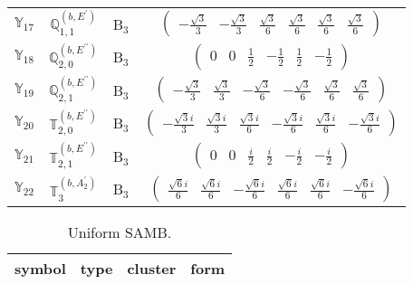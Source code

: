 \documentclass[fleqn,10pt,landscape]{article}
\begin{document}
\begin{itemize}
\begin{center}
\begin{longtable}{c|c|c|c}
$ \mathbb{Y}_{17} $ & $\mathbb{Q}_{1,1}^{(b,E^{\prime})}$ & B$_{3}$ & $\begin{pmatrix} - \frac{\sqrt{3}}{3} & - \frac{\sqrt{3}}{3} & \frac{\sqrt{3}}{6} & \frac{\sqrt{3}}{6} & \frac{\sqrt{3}}{6} & \frac{\sqrt{3}}{6} \end{pmatrix}$ \\
$ \mathbb{Y}_{18} $ & $\mathbb{Q}_{2,0}^{(b,E^{\prime\prime})}$ & B$_{3}$ & $\begin{pmatrix} 0 & 0 & \frac{1}{2} & - \frac{1}{2} & \frac{1}{2} & - \frac{1}{2} \end{pmatrix}$ \\
$ \mathbb{Y}_{19} $ & $\mathbb{Q}_{2,1}^{(b,E^{\prime\prime})}$ & B$_{3}$ & $\begin{pmatrix} - \frac{\sqrt{3}}{3} & \frac{\sqrt{3}}{3} & - \frac{\sqrt{3}}{6} & - \frac{\sqrt{3}}{6} & \frac{\sqrt{3}}{6} & \frac{\sqrt{3}}{6} \end{pmatrix}$ \\
$ \mathbb{Y}_{20} $ & $\mathbb{T}_{2,0}^{(b,E^{\prime\prime})}$ & B$_{3}$ & $\begin{pmatrix} - \frac{\sqrt{3} i}{3} & \frac{\sqrt{3} i}{3} & \frac{\sqrt{3} i}{6} & - \frac{\sqrt{3} i}{6} & \frac{\sqrt{3} i}{6} & - \frac{\sqrt{3} i}{6} \end{pmatrix}$ \\
$ \mathbb{Y}_{21} $ & $\mathbb{T}_{2,1}^{(b,E^{\prime\prime})}$ & B$_{3}$ & $\begin{pmatrix} 0 & 0 & \frac{i}{2} & \frac{i}{2} & - \frac{i}{2} & - \frac{i}{2} \end{pmatrix}$ \\
$ \mathbb{Y}_{22} $ & $\mathbb{T}_{3}^{(b,A_{2}^{\prime})}$ & B$_{3}$ & $\begin{pmatrix} \frac{\sqrt{6} i}{6} & \frac{\sqrt{6} i}{6} & - \frac{\sqrt{6} i}{6} & \frac{\sqrt{6} i}{6} & \frac{\sqrt{6} i}{6} & - \frac{\sqrt{6} i}{6} \end{pmatrix}$ \\
\end{longtable}
\end{center}
\begin{center}
\renewcommand{\arraystretch}{1.3}
\begin{longtable}{c|c|c|c}
\caption{Uniform SAMB.}
 \\
 \hline \hline
symbol & type & cluster & form \\ \hline \endfirsthead


\end{longtable}
\end{center}
\end{itemize}
\end{document}
